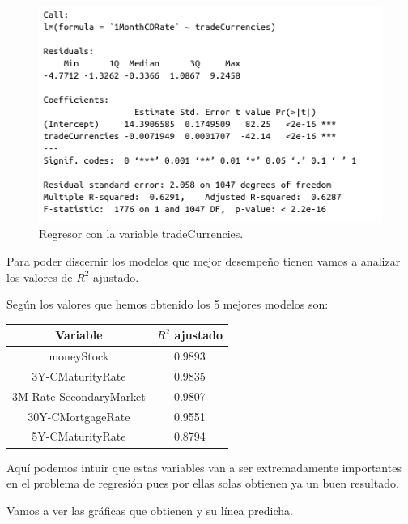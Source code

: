 \documentclass[12pt,a4paper]{article}
\begin{document}
\begin{figure}[H]
	\centering 
	\includegraphics[scale=0.55]{./Imagenes/Regresion/regresor_1va15.png}
	\caption{Regresor con la variable tradeCurrencies.}
\end{figure}

Para poder discernir los modelos que mejor desempeño tienen vamos a analizar los valores de $R^2$ ajustado.

Según los valores que hemos obtenido los 5 mejores modelos son:

\begin{table}[H]
	\centering
	\begin{tabular}{|c|c|}
		\hline
		\textbf{Variable}       & \textbf{$R^2$ ajustado} \\ \hline
		moneyStock              & 0.9893                  \\ \hline
		3Y-CMaturityRate        & 0.9835                  \\ \hline
		3M-Rate-SecondaryMarket & 0.9807                  \\ \hline
		30Y-CMortgageRate       & 0.9551                  \\ \hline
		5Y-CMaturityRate        & 0.8794                  \\ \hline
	\end{tabular}
\end{table}

Aquí podemos intuir que estas variables van a ser extremadamente importantes en el problema de regresión pues por ellas solas obtienen ya un buen resultado.

Vamos a ver las gráficas que obtienen y su línea predicha.
\end{document}
